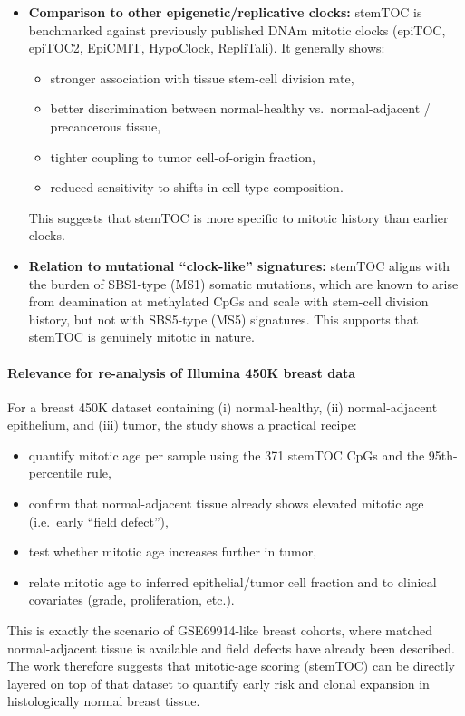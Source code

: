 \documentclass[10pt]{extarticle}
\begin{document}
\begin{itemize}[label=-]
  \item \textbf{Comparison to other epigenetic/replicative clocks:} stemTOC is benchmarked against previously published DNAm mitotic clocks (epiTOC, epiTOC2, EpiCMIT, HypoClock, RepliTali). It generally shows:
    \begin{itemize}[label=-]
      \item stronger association with tissue stem-cell division rate,
      \item better discrimination between normal-healthy vs.\ normal-adjacent / precancerous tissue,
      \item tighter coupling to tumor cell-of-origin fraction,
      \item reduced sensitivity to shifts in cell-type composition.
    \end{itemize}
    This suggests that stemTOC is more specific to mitotic history than earlier clocks.
  \item \textbf{Relation to mutational ``clock-like'' signatures:} stemTOC aligns with the burden of SBS1-type (MS1) somatic mutations, which are known to arise from deamination at methylated CpGs and scale with stem-cell division history, but not with SBS5-type (MS5) signatures. This supports that stemTOC is genuinely mitotic in nature.
\end{itemize}

\paragraph{Relevance for re-analysis of Illumina 450K breast data}
For a breast 450K dataset containing (i) normal-healthy, (ii) normal-adjacent epithelium, and (iii) tumor, the study shows a practical recipe:
\begin{itemize}[label=-]
  \item quantify mitotic age per sample using the 371 stemTOC CpGs and the 95th-percentile rule,
  \item confirm that normal-adjacent tissue already shows elevated mitotic age (i.e.\ early ``field defect''),
  \item test whether mitotic age increases further in tumor,
  \item relate mitotic age to inferred epithelial/tumor cell fraction and to clinical covariates (grade, proliferation, etc.).
\end{itemize}
This is exactly the scenario of GSE69914-like breast cohorts, where matched normal-adjacent tissue is available and field defects have already been described. The work therefore suggests that mitotic-age scoring (stemTOC) can be directly layered on top of that dataset to quantify early risk and clonal expansion in histologically normal breast tissue.
\end{document}
